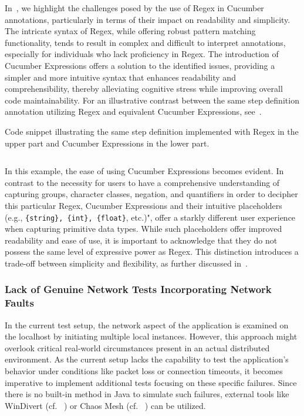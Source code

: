 In~, we highlight the challenges posed by the use of \ac{Regex} in Cucumber annotations, particularly in terms of their impact on readability and simplicity. The intricate syntax of \ac{Regex}, while offering robust pattern matching functionality, tends to result in complex and difficult to interpret annotations, especially for individuals who lack proficiency in \ac{Regex}. The introduction of Cucumber Expressions offers a solution to the identified issues, providing a simpler and more intuitive syntax that enhances readability and comprehensibility, thereby alleviating cognitive stress while improving overall code maintainability. For an illustrative contrast between the same step definition annotation utilizing \ac{Regex} and equivalent Cucumber Expressions, see~.

\begin{listing}[!ht]
\caption{Code snippet illustrating the same step definition implemented with \ac{Regex} in the upper part and Cucumber Expressions in the lower part.}
\label{lst:simpleRegex}
\inputminted{java}{files/code/simpleRegex.java}
\end{listing}

In this example, the ease of using Cucumber Expressions becomes evident. In contrast to the necessity for users to have a comprehensive understanding of capturing groups, character classes, negation, and quantifiers in order to decipher this particular \ac{Regex}, Cucumber Expressions and their intuitive placeholders (e.g., \verb|{string}, {int}, {float}|, etc.)", offer a starkly different user experience when capturing primitive data types. While such placeholders offer improved readability and ease of use, it is important to acknowledge that they do not possess the same level of expressive power as \ac{Regex}. This distinction introduces a trade-off between simplicity and flexibility, as further discussed in~. 


\subsubsection{Lack of Genuine Network Tests Incorporating Network Faults}
\label{sub:lack-network-tests}

In the current test setup, the network aspect of the application is examined on the localhost by initiating multiple local instances. However, this approach might overlook critical real-world circumstances present in an actual distributed environment. As the current setup lacks the capability to test the application's behavior under conditions like packet loss or connection timeouts, it becomes imperative to implement additional tests focusing on these specific failures. Since there is no built-in method in Java to simulate such failures, external tools like WinDivert (cf. ~) or Chaos Mesh (cf. ~) can be utilized.

